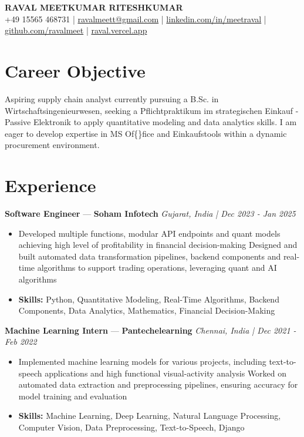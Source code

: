 \documentclass[a4paper,10pt]{article}
\begin{document}
\begin{center}
  {\Large\bfseries RAVAL MEETKUMAR RITESHKUMAR}\\[2pt]
  {\small +49 15565 468731 \;|\; \href{mailto:ravalmeett@gmail.com}{ravalmeett@gmail.com} \;|\; \href{https://www.linkedin.com/in/meetraval/}{linkedin.com/in/meetraval} \;|\; \href{https://github.com/ravalmeet}{github.com/ravalmeet} \;|\; \href{https://raval.vercel.app/}{raval.vercel.app}}
\end{center}
\vspace{-3pt}

\section*{Career Objective}
Aspiring supply chain analyst currently pursuing a B.Sc. in Wirtschaftsingenieurwesen, seeking a Pflichtpraktikum im strategischen Einkauf - Passive Elektronik to apply quantitative modeling and data analytics skills. I am eager to develop expertise in MS Of\{\}fice and Einkaufstools within a dynamic procurement environment.\par

\section*{Experience}
\textbf{Software Engineer} — \textbf{Soham Infotech} \hfill \textit{Gujarat, India \;|\; Dec 2023 - Jan 2025}\par
\vspace{1pt}
\begin{itemize}
  \item Developed multiple functions, modular API endpoints and quant models achieving high level of profitability in financial decision-making Designed and built automated data transformation pipelines, backend components and real-time algorithms to support trading operations, leveraging quant and AI algorithms
  \item \textbf{Skills:} Python, Quantitative Modeling, Real-Time Algorithms, Backend Components, Data Analytics, Mathematics, Financial Decision-Making
\end{itemize}
\vspace{3pt}
\textbf{Machine Learning Intern} — \textbf{Pantechelearning} \hfill \textit{Chennai, India \;|\; Dec 2021 - Feb 2022}\par
\vspace{1pt}
\begin{itemize}
  \item Implemented machine learning models for various projects, including text-to-speech applications and high functional visual-activity analysis Worked on automated data extraction and preprocessing pipelines, ensuring accuracy for model training and evaluation
  \item \textbf{Skills:} Machine Learning, Deep Learning, Natural Language Processing, Computer Vision, Data Preprocessing, Text-to-Speech, Django
\end{itemize}
\end{document}
